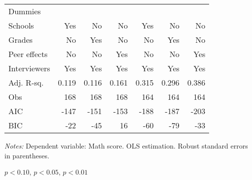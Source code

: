 \begin{table}[!h]
\begin{adjustbox}{width=1\textwidth}
\begin{threeparttable}
\begin{tabular}{l*{6}{D{.}{.}{-1}}}
Dummies &&&&& \\
Schools             &                 Yes   &                  No   &                  No   &                 Yes   &                  No   &                  No   \\
Grades              &                  No   &                 Yes   &                  No   &                  No   &                 Yes   &                  No   \\
Peer effects        &                  No   &                  No   &                 Yes   &                  No   &                  No   &                 Yes   \\
Interviewers        &                 Yes   &                 Yes   &                 Yes   &                 Yes   &                 Yes   &                 Yes   \\
\midrule
Adj. R-sq.          &               0.119   &               0.116   &               0.161   &               0.315   &               0.296   &               0.386   \\
Obs                 &                 168   &                 168   &                 168   &                 164   &                 164   &                 164   \\
AIC                 &                -147   &                -151   &                -153   &                -188   &                -187   &                -203   \\
BIC                 &                 -22   &                 -45   &                  16   &                 -60   &                 -79   &                 -33   \\
\bottomrule
\end{tabular}
\begin{tablenotes}
\footnotesize
\item \textit{Notes:} Dependent variable: Math score. OLS estimation. Robust standard errors in parentheses.
\item \sym{*} \(p<0.10\), \sym{**} \(p<0.05\), \sym{***} \(p<0.01\)
\end{tablenotes}
\end{threeparttable}
\end{adjustbox}
\label{tab:rev_cause}
\end{table}